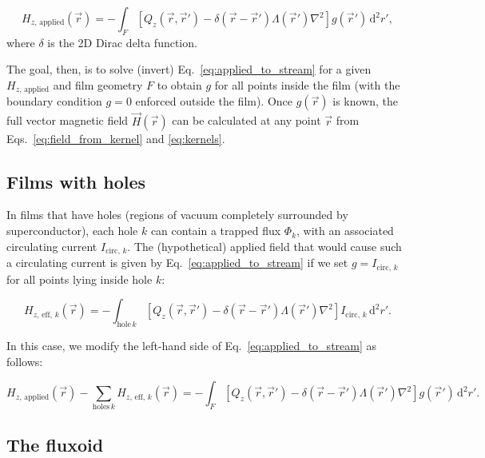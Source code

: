 \documentclass[final,3p,times]{elsarticle}
\newcounter{bla}
\begin{document}
\begin{equation}
    \label{eq:applied_to_stream}
    H_{z,\,\mathrm{applied}}(\vec{r})
    = -\int_F\left[
        Q_z(\vec{r},\vec{r}')-\delta(\vec{r}-\vec{r}')\Lambda(\vec{r}')\nabla^2\right
    ]g(\vec{r}')\,\mathrm{d}^2r',
\end{equation}
where $\delta$ is the 2D Dirac delta function.

The goal, then, is to solve (invert) Eq.~\ref{eq:applied_to_stream} for a given $H_{z,\,\mathrm{applied}}$ and film geometry $F$ to obtain $g$ for all points inside the film (with the boundary condition $g=0$ enforced outside the film). Once $g(\vec{r})$ is known, the full vector magnetic field $\vec{H}(\vec{r})$ can be calculated at any point $\vec{r}$
from Eqs.~\ref{eq:field_from_kernel} and \ref{eq:kernels}.

\subsection{Films with holes}
\label{section:model:holes}

In films that have holes (regions of vacuum completely surrounded by superconductor), each hole $k$ can contain a trapped flux $\Phi_k$, with an associated circulating current $I_{\mathrm{circ},\,k}$. The (hypothetical) applied field that would cause such a circulating current is given by Eq.~\ref{eq:applied_to_stream} if we set $g=I_{\mathrm{circ},\,k}$ for all points lying inside hole $k$:

\begin{equation}
    \label{eq:Heff}
    H_{z,\,\mathrm{eff},\,k}(\vec{r}) = -\int_{\mathrm{hole}\,k}[
        Q_z(\vec{r},\vec{r}')-\delta(\vec{r}-\vec{r}')\Lambda(\vec{r}')\nabla^2
    ] I_{\mathrm{circ},\,k} \,\mathrm{d}^2r'.   
\end{equation}

In this case, we modify the left-hand side of Eq.~\ref{eq:applied_to_stream} as follows:

\begin{equation}
    \label{eq:Heff_sub}
    H_{z,\,\mathrm{applied}}(\vec{r}) - \sum_{\mathrm{holes}\,k} H_{z,\,\mathrm{eff},\,k}(\vec{r})
    = -\int_F\left[
        Q_z(\vec{r},\vec{r}')-\delta(\vec{r}-\vec{r}')\Lambda(\vec{r}')\nabla^2\right
    ]g(\vec{r}')\,\mathrm{d}^2r'.
\end{equation}

\subsection{The fluxoid}
\label{section:model:fluxoid}
\end{document}
